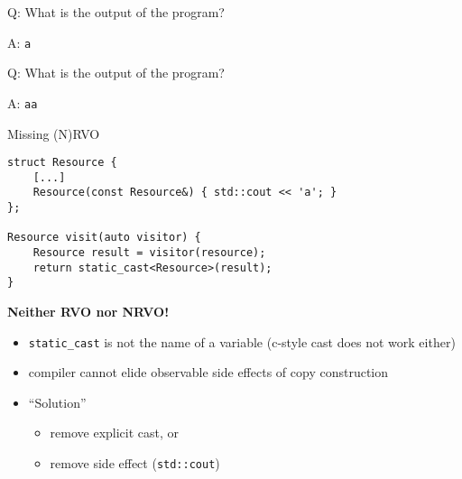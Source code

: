 \begin{frame}
    \centering

\end{frame}

\begin{frame}
    \centering
    \scalebox{5.}{\color{vertexDarkRed}$*$}
\end{frame}

\begin{frame}[fragile]{Q: What is the output of the program?}
\end{frame}

\begin{frame}[fragile]{A: \texttt{a}}
\end{frame}

\begin{frame}[fragile]{Q: What is the output of the program?}
\end{frame}

\begin{frame}[fragile]{A: \texttt{aa}}
\end{frame}

\begin{frame}[fragile]{Missing (N)RVO}
    \begin{lstlisting}
struct Resource {
    [...]
    Resource(const Resource&) { std::cout << 'a'; }
};

Resource visit(auto visitor) {
    Resource result = visitor(resource);
    return static_cast<Resource>(result);
}
    \end{lstlisting}

    \textbf{Neither RVO nor NRVO!}
    \begin{itemize}
        \item \texttt{static\_cast} is not the name of a variable (c-style cast does not work either)
        \item compiler cannot elide observable side effects of copy construction
        \item \enquote{Solution}
        \begin{itemize}
            \item remove explicit cast, or
            \item remove side effect (\texttt{std::cout})
        \end{itemize}
    \end{itemize}
\end{frame}

